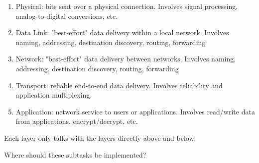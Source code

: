 \begin{enumerate}
    \item Physical: bits sent over a physical connection. Involves
          signal processing, analog-to-digital conversions, etc.
    \item Data Link: "best-effort" data delivery within a local network.
          Involves naming, addressing, destination discovery, routing, forwarding
    \item Network: "best-effort" data delivery between networks.
          Involves naming, addressing, destination discovery, routing, forwarding
    \item Transport: reliable end-to-end data delivery.
          Involves reliability and application multiplexing.
    \item Application: network service to users or applications.
          Involves read/write data from applications, encrypt/decrypt, etc.
\end{enumerate}

Each layer only talks with the layers directly above and below.

Where should these subtasks be implemented?
